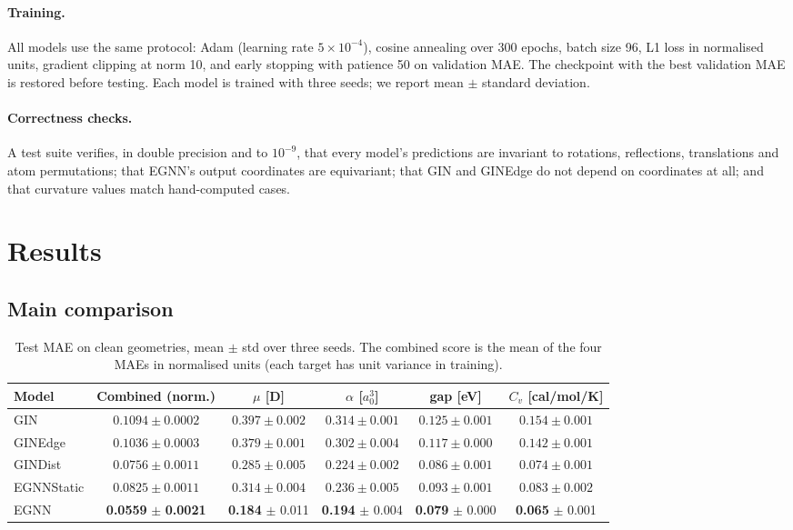 \documentclass[11pt,a4paper]{article}
\newcommand{\best}[1]{\textbf{#1}}
\begin{document}
\paragraph{Training.} All models use the same protocol: Adam (learning rate
$5\times10^{-4}$), cosine annealing over 300 epochs, batch size 96, L1 loss in normalised
units, gradient clipping at norm 10, and early stopping with patience 50 on validation MAE.
The checkpoint with the best validation MAE is restored before testing. Each model is trained
with three seeds; we report mean $\pm$ standard deviation.

\paragraph{Correctness checks.} A test suite verifies, in double precision and to $10^{-9}$,
that every model's predictions are invariant to rotations, reflections, translations and
atom permutations; that EGNN's output coordinates are equivariant; that GIN and GINEdge do
not depend on coordinates at all; and that curvature values match hand-computed cases.

\section{Results}

\subsection{Main comparison}\label{sec:main}

\begin{table}[t]
\centering
\small
\setlength{\tabcolsep}{4pt}
\begin{tabular}{lccccc}
\toprule
Model & Combined (norm.) & $\mu$ [D] & $\alpha$ [$a_0^3$] & gap [eV] & $C_v$ [cal/mol/K] \\
\midrule
GIN        & $0.1094 \pm 0.0002$ & $0.397 \pm 0.002$ & $0.314 \pm 0.001$ & $0.125 \pm 0.001$ & $0.154 \pm 0.001$ \\
GINEdge    & $0.1036 \pm 0.0003$ & $0.379 \pm 0.001$ & $0.302 \pm 0.004$ & $0.117 \pm 0.000$ & $0.142 \pm 0.001$ \\
GINDist    & $0.0756 \pm 0.0011$ & $0.285 \pm 0.005$ & $0.224 \pm 0.002$ & $0.086 \pm 0.001$ & $0.074 \pm 0.001$ \\
EGNNStatic & $0.0825 \pm 0.0011$ & $0.314 \pm 0.004$ & $0.236 \pm 0.005$ & $0.093 \pm 0.001$ & $0.083 \pm 0.002$ \\
EGNN       & \best{0.0559} $\pm$ \best{0.0021} & \best{0.184} $\pm$ 0.011 & \best{0.194} $\pm$ 0.004 & \best{0.079} $\pm$ 0.000 & \best{0.065} $\pm$ 0.001 \\
\bottomrule
\end{tabular}
\caption{Test MAE on clean geometries, mean $\pm$ std over three seeds. The combined score is
the mean of the four MAEs in normalised units (each target has unit variance in training).}
\label{tab:main}
\end{table}
\end{document}
